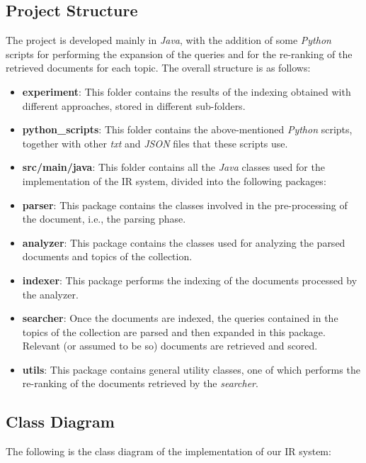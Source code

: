 \subsection{Project Structure}
The project is developed mainly in \textit{Java}, with the addition of some \textit{Python} scripts for performing the expansion of the queries and for the re-ranking of the retrieved documents for each topic. The overall structure is as follows:
\begin{itemize}
    \item \textbf{experiment}: This folder contains the results of the indexing obtained with different approaches, stored in different sub-folders.

    \item \textbf{python\_scripts}: This folder contains the above-mentioned \textit{Python} scripts, together with other \textit{txt} and \textit{JSON} files that these scripts use.

    \item \textbf{src/main/java}: This folder contains all the \textit{Java} classes used for the implementation of the \ac{IR} system, divided into the following packages:


    \item \textbf{parser}: This package contains the classes involved in the pre-processing of the document, i.e., the parsing phase.

    \item \textbf{analyzer}: This package contains the classes used for analyzing the parsed documents and topics of the collection.

    \item \textbf{indexer}: This package performs the indexing of the documents processed by the analyzer.

    \item \textbf{searcher}: Once the documents are indexed, the queries contained in the topics of the collection are parsed and then expanded in this package. Relevant (or assumed to be so) documents are retrieved and scored.

    \item \textbf{utils}: This package contains general utility classes, one of which performs the re-ranking of the documents retrieved by the \textit{searcher}.

\end{itemize}
\subsection{Class Diagram}
The following is the class diagram of the implementation of our IR system:

